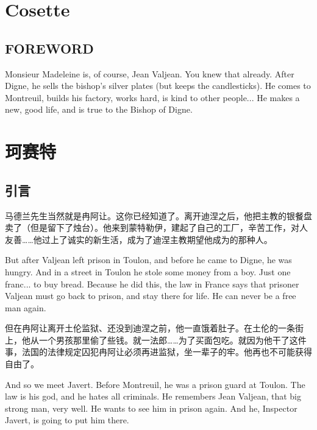 \documentclass[fontset=ubuntu, zihao=5]{ctexart}
\begin{document}
\begin{paracol}{2}

  \section{Cosette}

  \subsection*{FOREWORD}


  Monsieur Madeleine is, of course, Jean Valjean. You knew that already. After Digne, he sells the bishop's silver plates (but keeps the candlesticks). He comes to Montreuil, builds his factory, works hard, is kind to other people... He makes a new, good life, and is true to the Bishop of Digne.

  \switchcolumn

  \section*{珂赛特}

  \subsection*{引言}

  马德兰先生当然就是冉阿让。这你已经知道了。离开迪涅之后，他把主教的银餐盘卖了（但是留下了烛台）。他来到蒙特勒伊，建起了自己的工厂，辛苦工作，对人友善……他过上了诚实的新生活，成为了迪涅主教期望他成为的那种人。

  \switchcolumn*

  But after Valjean left prison in Toulon, and before he came to Digne, he was hungry. And in a street in Toulon he stole some money from a boy. Just one franc... to buy bread. Because he did this, the law in France says that prisoner Valjean must go back to prison, and stay there for life. He can never be a free man again.

  \switchcolumn

  但在冉阿让离开土伦监狱、还没到迪涅之前，他一直饿着肚子。在土伦的一条街上，他从一个男孩那里偷了些钱。就一法郎……为了买面包吃。就因为他干了这件事，法国的法律规定囚犯冉阿让必须再进监狱，坐一辈子的牢。他再也不可能获得自由了。

  \switchcolumn*

  And so we meet Javert. Before Montreuil, he was a prison guard at Toulon. The law is his god, and he hates all criminals. He remembers Jean Valjean, that big strong man, very well. He wants to see him in prison again. And he, Inspector Javert, is going to put him there.


\end{paracol}
\end{document}
